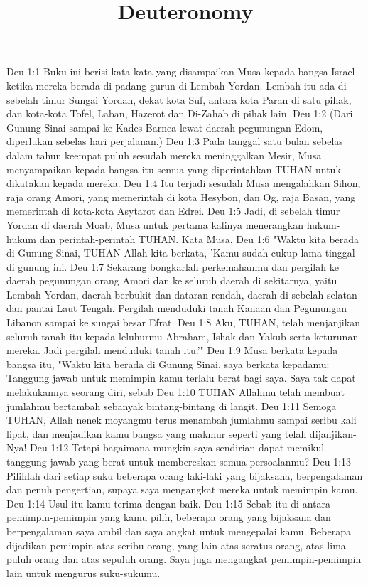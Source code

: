 

\title{Deuteronomy}

Deu 1:1  Buku ini berisi kata-kata yang disampaikan Musa kepada bangsa Israel ketika mereka berada di padang gurun di Lembah Yordan. Lembah itu ada di sebelah timur Sungai Yordan, dekat kota Suf, antara kota Paran di satu pihak, dan kota-kota Tofel, Laban, Hazerot dan Di-Zahab di pihak lain.
Deu 1:2  (Dari Gunung Sinai sampai ke Kades-Barnea lewat daerah pegunungan Edom, diperlukan sebelas hari perjalanan.)
Deu 1:3  Pada tanggal satu bulan sebelas dalam tahun keempat puluh sesudah mereka meninggalkan Mesir, Musa menyampaikan kepada bangsa itu semua yang diperintahkan TUHAN untuk dikatakan kepada mereka.
Deu 1:4  Itu terjadi sesudah Musa mengalahkan Sihon, raja orang Amori, yang memerintah di kota Hesybon, dan Og, raja Basan, yang memerintah di kota-kota Asytarot dan Edrei.
Deu 1:5  Jadi, di sebelah timur Yordan di daerah Moab, Musa untuk pertama kalinya menerangkan hukum-hukum dan perintah-perintah TUHAN. Kata Musa,
Deu 1:6  "Waktu kita berada di Gunung Sinai, TUHAN Allah kita berkata, 'Kamu sudah cukup lama tinggal di gunung ini.
Deu 1:7  Sekarang bongkarlah perkemahanmu dan pergilah ke daerah pegunungan orang Amori dan ke seluruh daerah di sekitarnya, yaitu Lembah Yordan, daerah berbukit dan dataran rendah, daerah di sebelah selatan dan pantai Laut Tengah. Pergilah menduduki tanah Kanaan dan Pegunungan Libanon sampai ke sungai besar Efrat.
Deu 1:8  Aku, TUHAN, telah menjanjikan seluruh tanah itu kepada leluhurmu Abraham, Ishak dan Yakub serta keturunan mereka. Jadi pergilah menduduki tanah itu.'"
Deu 1:9  Musa berkata kepada bangsa itu, "Waktu kita berada di Gunung Sinai, saya berkata kepadamu: Tanggung jawab untuk memimpin kamu terlalu berat bagi saya. Saya tak dapat melakukannya seorang diri, sebab
Deu 1:10  TUHAN Allahmu telah membuat jumlahmu bertambah sebanyak bintang-bintang di langit.
Deu 1:11  Semoga TUHAN, Allah nenek moyangmu terus menambah jumlahmu sampai seribu kali lipat, dan menjadikan kamu bangsa yang makmur seperti yang telah dijanjikan-Nya!
Deu 1:12  Tetapi bagaimana mungkin saya sendirian dapat memikul tanggung jawab yang berat untuk membereskan semua persoalanmu?
Deu 1:13  Pilihlah dari setiap suku beberapa orang laki-laki yang bijaksana, berpengalaman dan penuh pengertian, supaya saya mengangkat mereka untuk memimpin kamu.
Deu 1:14  Usul itu kamu terima dengan baik.
Deu 1:15  Sebab itu di antara pemimpin-pemimpin yang kamu pilih, beberapa orang yang bijaksana dan berpengalaman saya ambil dan saya angkat untuk mengepalai kamu. Beberapa dijadikan pemimpin atas seribu orang, yang lain atas seratus orang, atas lima puluh orang dan atas sepuluh orang. Saya juga mengangkat pemimpin-pemimpin lain untuk mengurus suku-sukumu.
